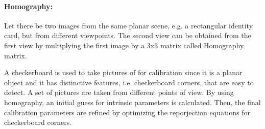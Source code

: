 \documentclass[11pt]{article}
\begin{document}
    \paragraph{Homography:} Let there be two images from the same planar scene, e.g. a rectangular identity card, but from
    different viewpoints. The second view can be obtained from the first view by multiplying the first image by
    a 3x3 matrix called Homography matrix.

    A checkerboard is used to take pictures of for calibration since it is a planar object and it has distinctive features,
    i.e. checkerboard corners, that are easy to detect. A set of pictures are taken from different points of view.
    By using homography, an initial guess for intrinsic parameters is calculated. Then, the final calibration
    parameters are refined by optimizing the reporjection equations for checkerboard corners.
\end{document}
